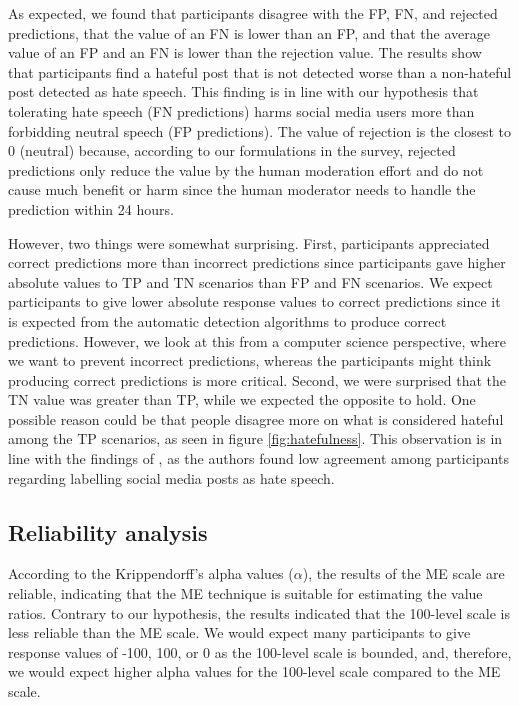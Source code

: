 %
As expected, we found that participants disagree with the FP, FN, and rejected predictions, that the value of an FN is lower than an FP, and that the average value of an FP and an FN is lower than the rejection value.
%
The results show that participants find a hateful post that is not detected worse than a non-hateful post detected as hate speech.
%
This finding is in line with our hypothesis that tolerating hate speech (FN predictions) harms social media users more than forbidding neutral speech (FP predictions).
%
The value of rejection is the closest to 0 (neutral) because, according to our formulations in the survey, rejected predictions only reduce the value by the human moderation effort and do not cause much benefit or harm since the human moderator needs to handle the prediction within 24 hours.
%

%
However, two things were somewhat surprising.
%
First, participants appreciated correct predictions more than incorrect predictions since participants gave higher absolute values to TP and TN scenarios than FP and FN scenarios.
%
We expect participants to give lower absolute response values to correct predictions since it is expected from the automatic detection algorithms to produce correct predictions.
%
However, we look at this from a computer science perspective, where we want to prevent incorrect predictions, whereas the participants might think producing correct predictions is more critical.
%
Second, we were surprised that the TN value was greater than TP, while we expected the opposite to hold.
%
One possible reason could be that people disagree more on what is considered hateful among the TP scenarios, as seen in figure \ref{fig:hatefulness}.
%
This observation is in line with the findings of \citet{ross2017measuring}, as the authors found low agreement among participants regarding labelling social media posts as hate speech.
%

\subsection{Reliability analysis}
\label{sec:discussion-reliability}
%
According to the Krippendorff's alpha values ($\alpha$), the results of the ME scale are reliable, indicating that the ME technique is suitable for estimating the value ratios.
%
Contrary to our hypothesis, the results indicated that the 100-level scale is less reliable than the ME scale.
%
We would expect many participants to give response values of -100, 100, or 0 as the 100-level scale is bounded, and, therefore, we would expect higher alpha values for the 100-level scale compared to the ME scale.
%

